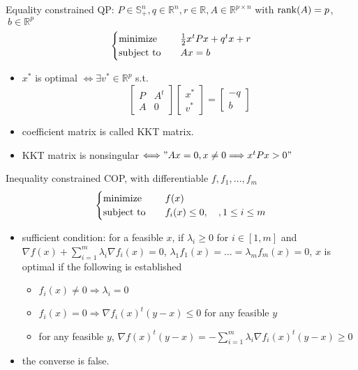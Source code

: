 \begin{remark}
    Equality constrained QP: $P \in \mathbb{S}_+^n, q \in \mathbb{R}^n, r \in \mathbb{R}, A \in \mathbb{R}^{p \times n}$ with $\operatorname{rank}(A) = p$,$\ b \in \mathbb{R}^p$ \[\begin{cases}
        \operatorname{minimize} \quad & \frac{1}{2}x^tPx + q^tx + r \\
        \operatorname{subject\ to} \quad & Ax = b
    \end{cases}\]
    \begin{itemize}
        \item $x^*$ is optimal $\Longleftrightarrow \exists v^* \in \mathbb{R}^p$ s.t.\[\begin{bmatrix}
            P & A^t \\
            A & 0
        \end{bmatrix} \begin{bmatrix}
            x^* \\ v^*
        \end{bmatrix} = \begin{bmatrix}
            -q \\ b
        \end{bmatrix}\]
        \item coefficient matrix is called KKT matrix.
        \item KKT matrix is nonsingular $\Longleftrightarrow "Ax = 0, x \neq 0 \Longrightarrow x^tPx > 0"$
    \end{itemize}
\end{remark}

\begin{remark}
    Inequality constrained COP, with differentiable $f, f_1, \dots, f_m$\[\begin{cases}
        \operatorname{minimize} \quad &f(x) \\
        \operatorname{subject\ to} \quad & f_i(x) \le 0, \quad , 1 \le i \le m
    \end{cases}\]
    \begin{itemize}
        \item sufficient condition: for a feasible $x$, if $\lambda_i \ge 0$ for $i \in [1, m]$ and $\nabla f(x)+\sum_{i=1}^{m} \lambda_{i} \nabla f_{i}(x)=0$, $\lambda_{1} f_{1}(x)=\ldots=\lambda_{m} f_{m}(x)=0$, $x$ is optimal if the following is established\begin{itemize}
            \item $f_i(x) \neq 0 \Longrightarrow \lambda_i = 0$
            \item $f_i(x) = 0 \Longrightarrow \nabla f_i(x)^t(y - x) \le 0$ for any feasible $y$
            \item for any feasible $y$, $\nabla f(x)^t (y - x) = -\sum_{i = 1}^m \lambda_i \nabla f_i(x)^t(y - x) \ge 0$
        \end{itemize}
        \item the converse is false.
    \end{itemize}
\end{remark}



